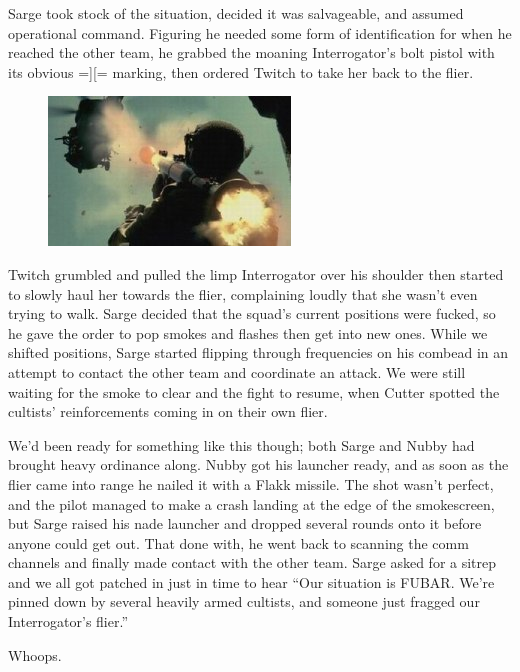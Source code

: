 Sarge took stock of the situation, decided it was salvageable, and assumed operational command. 
Figuring he needed some form of identification for when he reached the other team, he grabbed the moaning Interrogator’s bolt pistol with its obvious =][= marking, then ordered Twitch to take her back to the flier.

\begin{figure}
	\begin{center}
		\includegraphics[width=\figwidth]{pics/5/20.png}
	\end{center}
\end{figure}
Twitch grumbled and pulled the limp Interrogator over his shoulder then started to slowly haul her towards the flier, complaining loudly that she wasn’t even trying to walk. 
Sarge decided that the squad’s current positions were fucked, so he gave the order to pop smokes and flashes then get into new ones. 
While we shifted positions, Sarge started flipping through frequencies on his combead in an attempt to contact the other team and coordinate an attack. 
We were still waiting for the smoke to clear and the fight to resume, when Cutter spotted the cultists’ reinforcements coming in on their own flier.

We’d been ready for something like this though; 
both Sarge and Nubby had brought heavy ordinance along. 
Nubby got his launcher ready, and as soon as the flier came into range he nailed it with a Flakk missile. 
The shot wasn’t perfect, and the pilot managed to make a crash landing at the edge of the smokescreen, but Sarge raised his nade launcher and dropped several rounds onto it before anyone could get out. 
That done with, he went back to scanning the comm channels and finally made contact with the other team. 
Sarge asked for a sitrep and we all got patched in just in time to hear “Our situation is FUBAR.  
We’re pinned down by several heavily armed cultists, and someone just fragged our Interrogator's flier.”

Whoops.

